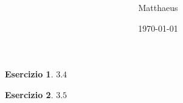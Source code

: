 \documentclass[italian]{article}
\theoremstyle{definition}
\newtheorem{ex}{Esercizio}
\newcommand{\answerspace}{\hspace{10cm}}
\begin{document}
\title{%
}
\author{Matthaeus}
\date{\today}
\maketitle
\section{}
\section{}
\section{}
	\begin{ex}
	$3.4$
	\answerspace
	\end{ex}

	\begin{ex}
	$3.5$
	\answerspace
	\end{ex}
\end{document}
